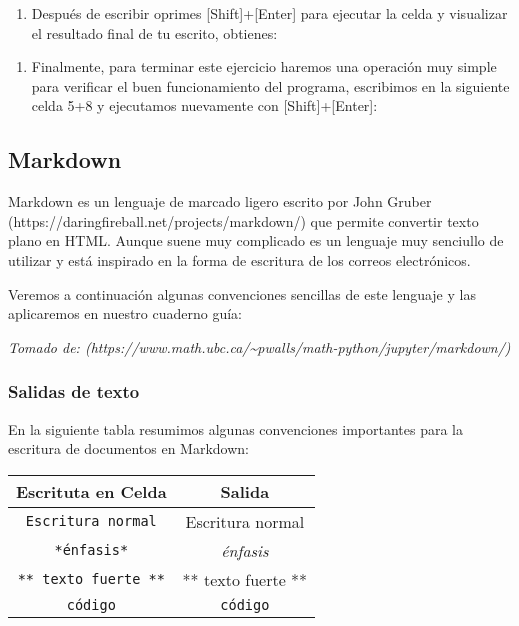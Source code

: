 \documentclass[11pt]{article}
\providecommand{\tightlist}{%
      \setlength{\itemsep}{0pt}\setlength{\parskip}{0pt}}
\begin{document}
\begin{enumerate}
\def\labelenumi{\arabic{enumi}.}
\setcounter{enumi}{6}
\tightlist
\item
  Después de escribir oprimes {[}Shift{]}+{[}Enter{]} para ejecutar la
  celda y visualizar el resultado final de tu escrito, obtienes:
\end{enumerate}

\begin{enumerate}
\def\labelenumi{\arabic{enumi}.}
\setcounter{enumi}{7}
\tightlist
\item
  Finalmente, para terminar este ejercicio haremos una operación muy
  simple para verificar el buen funcionamiento del programa, escribimos
  en la siguiente celda 5+8 y ejecutamos nuevamente con
  {[}Shift{]}+{[}Enter{]}:
\end{enumerate}

    \hypertarget{markdown}{%
\subsection{Markdown}\label{markdown}}

Markdown es un lenguaje de marcado ligero escrito por John Gruber
(https://daringfireball.net/projects/markdown/) que permite convertir
texto plano en HTML. Aunque suene muy complicado es un lenguaje muy
senciullo de utilizar y está inspirado en la forma de escritura de los
correos electrónicos.

Veremos a continuación algunas convenciones sencillas de este lenguaje y
las aplicaremos en nuestro cuaderno guía:

 \emph{Tomado de:
(https://www.math.ubc.ca/\textasciitilde{}pwalls/math-python/jupyter/markdown/)}

    \hypertarget{salidas-de-texto}{%
\subsubsection{Salidas de texto}\label{salidas-de-texto}}

En la siguiente tabla resumimos algunas convenciones importantes para la
escritura de documentos en Markdown:

\begin{longtable}[]{@{}cc@{}}
\toprule
\textbf{Escrituta en Celda} & \textbf{Salida}\tabularnewline
\midrule
\endhead
\texttt{Escritura\ normal} & Escritura normal\tabularnewline
\texttt{*énfasis*} & \emph{énfasis}\tabularnewline
\texttt{**\ texto\ fuerte\ **} & ** texto fuerte **\tabularnewline
\texttt{código} & \texttt{código}\tabularnewline
\bottomrule
\end{longtable}
\end{document}
